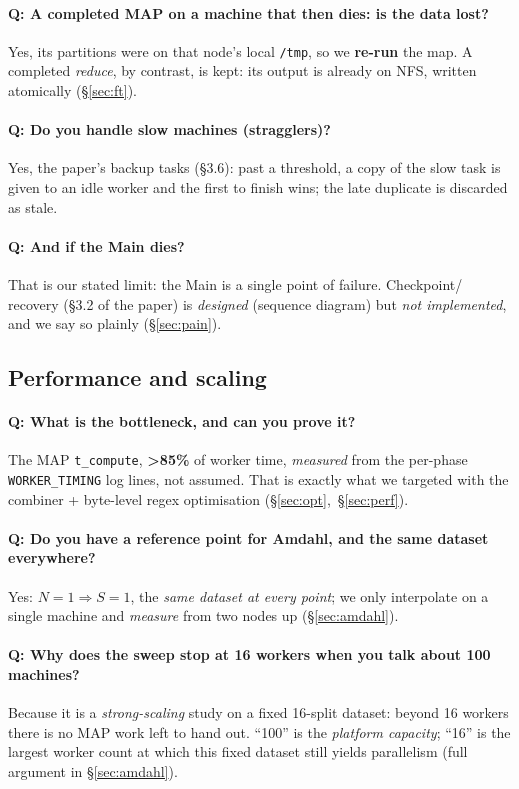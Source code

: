 \documentclass[11pt,a4paper]{article}
\newcommand{\code}[1]{\texttt{\small #1}}
\begin{document}
\paragraph{Q: A completed MAP on a machine that then dies: is the data lost?}
Yes, its partitions were on that node's local \code{/tmp}, so we \textbf{re-run}
the map. A completed \emph{reduce}, by contrast, is kept: its output is already on
NFS, written atomically (\S\ref{sec:ft}).

\paragraph{Q: Do you handle slow machines (stragglers)?}
Yes, the paper's backup tasks (\S3.6): past a threshold, a copy of the slow task
is given to an idle worker and the first to finish wins; the late duplicate is
discarded as stale.

\paragraph{Q: And if the Main dies?}
That is our stated limit: the Main is a single point of failure. Checkpoint/
recovery (\S3.2 of the paper) is \emph{designed} (sequence diagram) but
\emph{not implemented}, and we say so plainly (\S\ref{sec:pain}).

\subsection{Performance and scaling}

\paragraph{Q: What is the bottleneck, and can you prove it?}
The MAP \code{t\_compute}, \textbf{>85\%} of worker time, \emph{measured} from
the per-phase \code{WORKER\_TIMING} log lines, not assumed. That is exactly what
we targeted with the combiner + byte-level regex optimisation
(\S\ref{sec:opt},~\S\ref{sec:perf}).

\paragraph{Q: Do you have a reference point for Amdahl, and the same dataset
everywhere?} Yes: $N=1\Rightarrow S=1$, the \emph{same dataset at every point};
we only interpolate on a single machine and \emph{measure} from two nodes up
(\S\ref{sec:amdahl}).

\paragraph{Q: Why does the sweep stop at 16 workers when you talk about 100
machines?} Because it is a \emph{strong-scaling} study on a fixed 16-split
dataset: beyond 16 workers there is no MAP work left to hand out. ``100'' is the
\emph{platform capacity}; ``16'' is the largest worker count at which this fixed
dataset still yields parallelism (full argument in \S\ref{sec:amdahl}).
\end{document}
